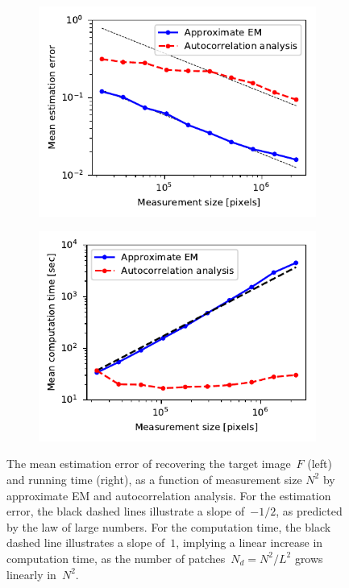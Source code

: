 \documentclass{article}
\begin{document}
\begin{figure}[!tb]
	\begin{subfigure}[ht]{\columnwidth}
		\centering
		\includegraphics[width=0.85\columnwidth]{figures/experiment_size_err.pdf}
	\end{subfigure}
	\hfill
	\begin{subfigure}[ht]{\columnwidth}
		\centering
		\includegraphics[width=0.85\columnwidth]{figures/experiment_size_time.pdf}
	\end{subfigure}
	\caption{The mean estimation error of recovering the target image~$F$ (left) and running time (right), as a function of measurement size $N^2$ by approximate EM and autocorrelation analysis. For the estimation error, the black dashed lines illustrate a slope of~$-1/2$, as predicted by the law of large numbers. For the computation time, the black dashed line illustrates a slope of~$1$, implying a linear increase in computation time, as the number of patches~\mbox{$N_d = N^2 / L^2$} grows linearly in~$N^2$.}
\label{fig:size_experiment}
\end{figure}
\end{document}

